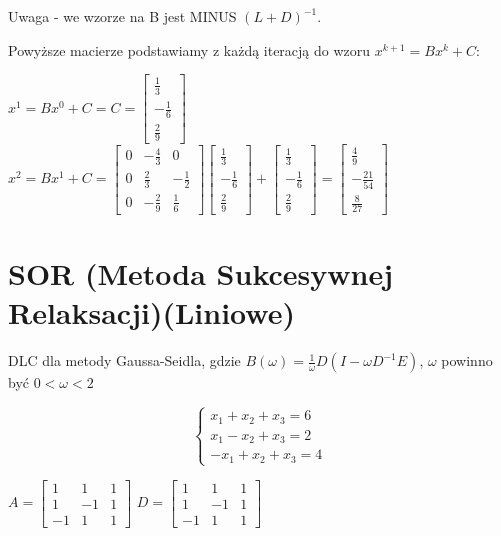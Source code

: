 \documentclass{article}
\begin{document}
Uwaga - we wzorze na B jest MINUS $(L+D)^{-1}$.

Powyższe macierze podstawiamy z każdą iteracją do wzoru $x^{k+1} = Bx^k + C$:

$x^1 = Bx^0 + C = C = \begin{bmatrix}\frac{1}{3}\\-\frac{1}{6}\\\frac{2}{9}\end{bmatrix} $ \\
$x^2 = Bx^1 + C = 
\begin{bmatrix}0 & -\frac{4}{3} & 0 \\0 & \frac{2}{3} & -\frac{1}{2} \\0 & -\frac{2}{9} & \frac{1}{6}\end{bmatrix}
\begin{bmatrix}\frac{1}{3}\\-\frac{1}{6}\\\frac{2}{9}\end{bmatrix}
+ \begin{bmatrix}\frac{1}{3}\\-\frac{1}{6}\\\frac{2}{9}\end{bmatrix}  = \begin{bmatrix}\frac{4}{9}\\-\frac{21}{54}\\\frac{8}{27}\end{bmatrix}$

\section{SOR (Metoda Sukcesywnej Relaksacji)(Liniowe)}
DLC dla metody Gaussa-Seidla, gdzie $B(\omega)=\frac{1}{\omega}D(I-\omega D^{-1}E)$, $\omega$ powinno być $0<\omega<2$

\begin{equation*}\begin{cases}
    x_1+x_2+x_3=6\\
    x_1-x_2+x_3=2\\
    -x_1+x_2+x_3=4
\end{cases}\end{equation*}

$A=\begin{bmatrix} 1 & 1 & 1 \\ 1 & -1 & 1 \\ -1 & 1 & 1 \end{bmatrix}$
$D=\begin{bmatrix} 1 & 1 & 1 \\ 1 & -1 & 1 \\ -1 & 1 & 1 \end{bmatrix}$
\end{document}
